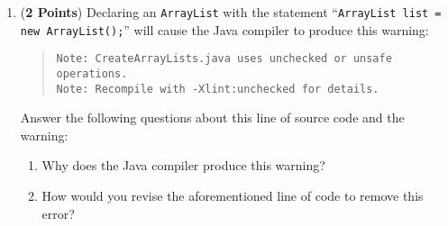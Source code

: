 \documentclass[12pt]{article}
\begin{document}
\begin{enumerate}
\begin{enumerate}
  \item ({\bf 2 Points}) Declaring an {\tt ArrayList} with the statement ``{\tt ArrayList list = new
      ArrayList();}'' will cause the Java compiler to produce this warning:
    
    \begin{quote}
      \begin{verbatim}
Note: CreateArrayLists.java uses unchecked or unsafe operations.
Note: Recompile with -Xlint:unchecked for details.
      \end{verbatim}
    \end{quote}

  \vspace*{-.25in}
  Answer the following questions about this line of source code and the warning:

  \begin{enumerate}

    \item Why does the Java compiler produce this warning?
      
    \item How would you revise the aforementioned line of code to remove this error?

  \end{enumerate}

  \end{enumerate}

    \end{enumerate}

  
\end{document}
